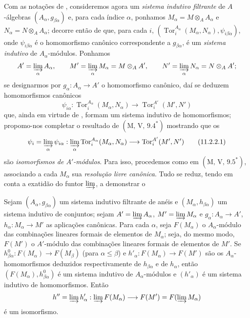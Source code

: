 \begin{env}[11.2.2]
\label{IV.11.2.2}
Com as notações de , consideremos agora um \emph{sistema indutivo filtrante} de $A$-álgebras $(A_\alpha,g_{\beta\alpha})$ e, para cada índice $\alpha$, ponhamos $M_\alpha=M\otimes_AA_\alpha$ e $N_\alpha=N\otimes_AA_\alpha$; decorre então de  que, para cada $i$, $(\operatorname{Tor}_i^{A_\alpha}(M_\alpha,N_\alpha),\psi_{i\beta\alpha})$, onde $\psi_{i\beta\alpha}$ é o homomorfismo canônico  correspondente a $g_{\beta\alpha}$, é um \emph{sistema indutivo} de $A_\alpha$-módulos. Ponhamos
\[
A'=\varinjlim_\alpha A_\alpha,\qquad
M'=\varinjlim_\alpha M_\alpha=M\otimes_AA',\qquad
N'=\varinjlim_\alpha N_\alpha=N\otimes_AA';
\]
se designarmos por $g_\alpha:A_\alpha\to A'$ o homomorfismo canônico, daí se deduzem homomorfismos canônicos 
\[
\psi_{i\alpha}:\operatorname{Tor}_i^{A_\alpha}(M_\alpha,N_\alpha)
\to\operatorname{Tor}_i^{A'}(M',N')
\]
que, ainda em virtude de , formam um sistema indutivo de homomorfismos; propomo-nos completar o resultado de $(\mathrm M,\,\mathrm V,\,9.4^*)$ mostrando que os
\begin{equation}
\psi_i=\varinjlim_\alpha\psi_{i\alpha}:
\varinjlim_\alpha\operatorname{Tor}_i^{A_\alpha}(M_\alpha,N_\alpha)
\to\operatorname{Tor}_i^{A'}(M',N')
\label{IV.11.2.2.1}
\tag{11.2.2.1}
\end{equation}
são \emph{isomorfismos de $A'$-módulos}. Para isso, procedemos como em $(\mathrm M,\,\mathrm V,\,9.5^*)$, associando a cada $M_\alpha$ sua \emph{resolução livre canônica}. Tudo se reduz, tendo em conta a exatidão do funtor $\varinjlim$, a demonstrar o
\end{env}


\begin{lemma}[11.2.2.2]
\label{IV.11.2.2.2}
Sejam $(A_\alpha,g_{\beta\alpha})$ um sistema indutivo filtrante de anéis e $(M_\alpha,h_{\beta\alpha})$ um sistema indutivo de conjuntos; sejam $A'=\varinjlim A_\alpha$, $M'=\varinjlim M_\alpha$ e $g_\alpha:A_\alpha\to A'$, $h_\alpha:M_\alpha\to M'$ as aplicações canônicas. Para cada $\alpha$, seja $F(M_\alpha)$ o $A_\alpha$-módulo das combinações lineares formais de elementos de $M_\alpha$; seja, do mesmo modo, $F(M')$ o $A'$-módulo das combinações lineares formais de elementos de $M'$. Se $h^0_{\beta\alpha}:F(M_\alpha)\to F(M_\beta)$ (para $\alpha\leq\beta$) e $h'_\alpha:F(M_\alpha)\to F(M')$ são os $A_\alpha$-homomorfismos deduzidos respectivamente de $h_{\beta\alpha}$ e de $h_\alpha$, então $(F(M_\alpha),h^0_{\beta\alpha})$ é um sistema indutivo de $A_\alpha$-módulos e $(h'_\alpha)$ é um sistema indutivo de homomorfismos. Então
\[
h''=\varinjlim h'_\alpha:\varinjlim F(M_\alpha)\to
F(M')=F(\varinjlim M_\alpha)
\]
é um isomorfismo.
\end{lemma}

